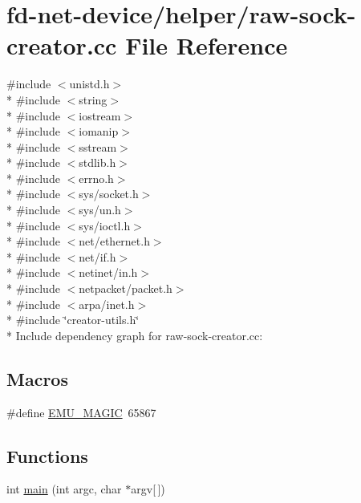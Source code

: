 \hypertarget{raw-sock-creator_8cc}{}\section{fd-\/net-\/device/helper/raw-\/sock-\/creator.cc File Reference}
\label{raw-sock-creator_8cc}
{\ttfamily \#include $<$unistd.\+h$>$}\\*
{\ttfamily \#include $<$string$>$}\\*
{\ttfamily \#include $<$iostream$>$}\\*
{\ttfamily \#include $<$iomanip$>$}\\*
{\ttfamily \#include $<$sstream$>$}\\*
{\ttfamily \#include $<$stdlib.\+h$>$}\\*
{\ttfamily \#include $<$errno.\+h$>$}\\*
{\ttfamily \#include $<$sys/socket.\+h$>$}\\*
{\ttfamily \#include $<$sys/un.\+h$>$}\\*
{\ttfamily \#include $<$sys/ioctl.\+h$>$}\\*
{\ttfamily \#include $<$net/ethernet.\+h$>$}\\*
{\ttfamily \#include $<$net/if.\+h$>$}\\*
{\ttfamily \#include $<$netinet/in.\+h$>$}\\*
{\ttfamily \#include $<$netpacket/packet.\+h$>$}\\*
{\ttfamily \#include $<$arpa/inet.\+h$>$}\\*
{\ttfamily \#include \char`\"{}creator-\/utils.\+h\char`\"{}}\\*
Include dependency graph for raw-\/sock-\/creator.cc\+:
\subsection*{Macros}
\begin{DoxyCompactItemize}
\item 
\#define \hyperlink{raw-sock-creator_8cc_adc226a140a49fe19a57e21bbe86341e4}{E\+M\+U\+\_\+\+M\+A\+G\+IC}~65867
\end{DoxyCompactItemize}
\subsection*{Functions}
\begin{DoxyCompactItemize}
\item 
int \hyperlink{raw-sock-creator_8cc_a0ddf1224851353fc92bfbff6f499fa97}{main} (int argc, char $\ast$argv\mbox{[}$\,$\mbox{]})
\end{DoxyCompactItemize}


